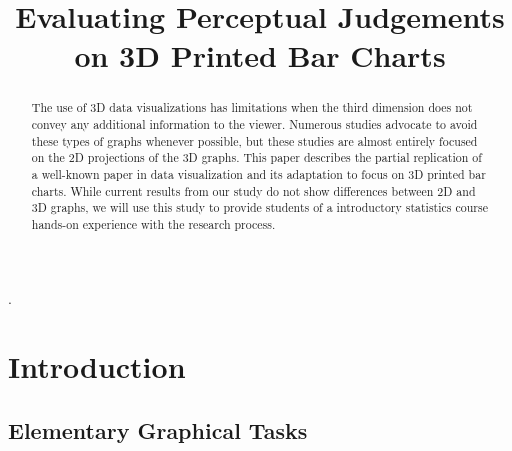 \documentclass[letterpaper,inpress,dvipsnames]{jdsart}
\begin{document}
\begin{frontmatter}

\title{Evaluating Perceptual Judgements on 3D Printed Bar Charts}

\author[1]{
      }
\author[1]{
    }

\address[1]{Department of Statistics, 
  , }

\begin{abstract}
The use of 3D data visualizations has limitations when the third dimension does not convey any additional information to the viewer. Numerous studies advocate to avoid these types of graphs whenever possible, but these studies are almost entirely focused on the 2D projections of the 3D graphs. This paper describes the partial replication of a well-known paper in data visualization and its adaptation to focus on 3D printed bar charts. While current results from our study do not show differences between 2D and 3D graphs, we will use this study to provide students of a introductory statistics course hands-on experience with the research process.
\end{abstract}

\begin{keywords}
.
\end{keywords}

\end{frontmatter}

\hypertarget{introduction}{%
\section{Introduction}\label{introduction}}

\hypertarget{elementary-graphical-tasks}{%
\subsection{Elementary Graphical Tasks}\label{elementary-graphical-tasks}}
\end{document}
